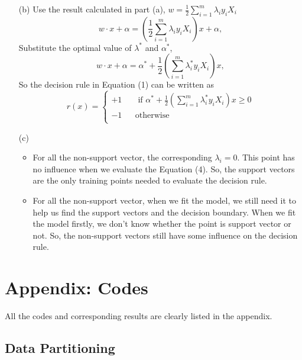 \documentclass[a4paper,12pt]{article}
\begin{document}
\begin{itemize}
\item[(b)] Use the result calculated in part (a), $w = \frac{1}{2} \sum_{i=1}^m \lambda_i y_i X_i $
$$
w \cdot x + \alpha = ( \frac{1}{2} \sum_{i=1}^m \lambda_i y_i X_i ) x + \alpha,
$$
Substitute the optimal value of $\lambda^*$ and $\alpha^*$,
$$
w \cdot x + \alpha =  \alpha^* + \frac{1}{2} (\sum_{i=1}^m \lambda_i^* y_i X_i ) x,
$$
So the decision rule in Equation (1) can be written as
$$ 
r(x) =\left\{
\begin{array}{rcl}
+1 && { \text{ if } \alpha^* + \frac{1}{2}(\sum_{i=1}^m \lambda_i^* y_i X_i )x \ge 0}\\
-1 && {\text{otherwise}}\\
\end{array} \right.
$$


\item[(c)]
\begin{itemize}
\item For all the non-support vector, the corresponding $\lambda_i = 0$. This point has no influence when we evaluate the Equation (4). So, the support vectors are the only training points needed to evaluate the decision rule.

\item For all the non-support vector, when we fit the model, we still need it to help us find the support vectors and the decision boundary. When we fit the model firstly, we don't know whether the point is support vector or not. So, the non-support vectors still have some influence on the decision rule.
\end{itemize}
\end{itemize}

\clearpage

\section{Appendix: Codes}

All the codes and corresponding results are clearly listed in the appendix.

    \subsection{Data Partitioning}\label{data-partitioning}
\end{document}
